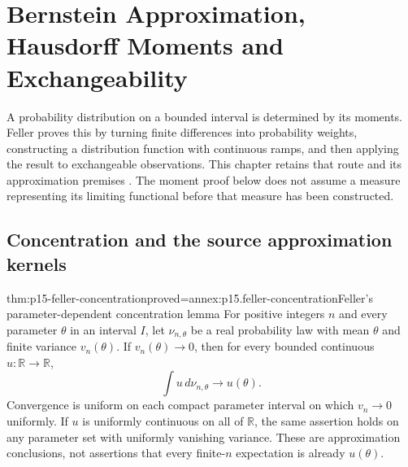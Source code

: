 \chapter{Bernstein Approximation, Hausdorff Moments and Exchangeability}
\label{sec:p15-feller-bernstein-hausdorff}

A probability distribution on a bounded interval is determined by its
moments. Feller proves this by turning finite differences into probability
weights, constructing a distribution function with continuous ramps, and
then applying the result to exchangeable observations. This chapter retains
that route and its approximation premises
\cite[vol.~II, VII.1--VII.4, pp.~219--230]{Feller1971ProbabilityII}.
The moment proof below does not assume a measure representing its limiting
functional before that measure has been constructed.

\section{Concentration and the source approximation kernels}

\begin{hbtheorem}{thm:p15-feller-concentration}{proved=annex:p15.feller-concentration}{Feller's parameter-dependent concentration lemma}
For positive integers \(n\) and every parameter \(\theta\) in an interval \(I\), let
\(\nu_{n,\theta}\) be a real probability law with mean \(\theta\)
and finite variance \(v_n(\theta)\). If \(v_n(\theta)\to0\), then
for every bounded continuous \(u:\mathbb R\to\mathbb R\),
\[
                        \int u\,d\nu_{n,\theta}\longrightarrow u(\theta).
\]
Convergence is uniform on each compact parameter interval on which
\(v_n\to0\) uniformly. If \(u\) is uniformly continuous on all of
\(\mathbb R\), the same assertion holds on any parameter set with
uniformly vanishing variance. These are approximation conclusions,
not assertions that every finite-\(n\) expectation is already \(u(\theta)\).
\end{hbtheorem}

